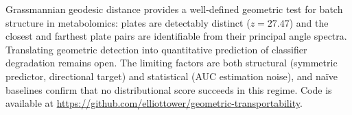 \documentclass{article}
\begin{document}
Grassmannian geodesic distance provides a well-defined geometric test for batch structure in metabolomics: plates are detectably distinct ($z = 27.47$) and the closest and farthest plate pairs are identifiable from their principal angle spectra. Translating geometric detection into quantitative prediction of classifier degradation remains open. The limiting factors are both structural (symmetric predictor, directional target) and statistical (AUC estimation noise), and na\"{i}ve baselines confirm that no distributional score succeeds in this regime. Code is available at \url{https://github.com/elliottower/geometric-transportability}.



\end{document}
